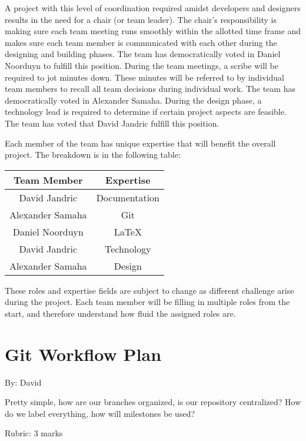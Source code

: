 \documentclass{article}
\begin{document}
A project with this level of coordination required amidst developers and
designers results in the need for a chair (or team leader). The chair's
responsibility is making sure each team meeting runs smoothly within the
allotted time frame and makes sure each team member is communicated with each
other during the designing and building phases. The team has democratically
voted in Daniel Noorduyn to fulfill this position.  During the team meetings, a
scribe will be required to jot minutes down. These minutes will be referred to
by individual team members to recall all team decisions during individual work.
The team has democratically voted in Alexander Samaha. During the design phase,
a technology lead is required to determine if certain project aspects are
feasible. The team has voted that David Jandric fulfill this position.

Each member of the team has unique expertise that will benefit the overall
project. The breakdown is in the following table:

\begin{center}
  \begin{tabular}{ |c|c| }
    \hline
    Team Member & Expertise\\
    \hline
     David Jandric & Documentation\\
     Alexander Samaha & Git\\
     Daniel Noorduyn & LaTeX\\
     David Jandric & Technology\\
     Alexander Samaha & Design\\
    \hline
  \end{tabular}
\end{center}

These roles and expertise fields are subject to change as different challenge
arise during the project. Each team member will be filling in multiple roles
from the start, and therefore understand how fluid the assigned roles are.

\section{Git Workflow Plan}
By: David

Pretty  simple,  how  are  our  branches  organized,  is  our  repository
centralized?
How do we label everything, how will milestones be used?

Rubric:  3 marks
\end{document}
